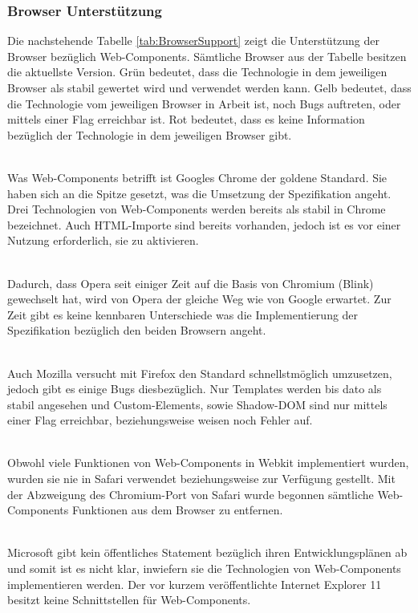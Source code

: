 \subsubsection{Browser Unterstützung}
\label{sec:3_WC_Support}

Die nachstehende Tabelle \ref{tab:BrowserSupport} zeigt die Unterstützung der Browser bezüglich Web-Components. Sämtliche Browser aus der Tabelle besitzen die aktuellste Version. Grün bedeutet, dass die Technologie in dem jeweiligen Browser als stabil gewertet wird und verwendet werden kann. Gelb bedeutet, dass die Technologie vom jeweiligen Browser in Arbeit ist, noch Bugs auftreten, oder mittels einer Flag erreichbar ist. Rot bedeutet, dass es keine Information bezüglich der Technologie in dem jeweiligen Browser gibt.

\begin{description}
 \hfill \\
Was Web-Components betrifft ist Googles Chrome der goldene Standard. Sie haben sich an die Spitze gesetzt, was die Umsetzung der Spezifikation angeht. Drei Technologien von Web-Components werden bereits als stabil in Chrome bezeichnet. Auch HTML-Importe sind bereits vorhanden, jedoch ist es vor einer Nutzung erforderlich, sie zu aktivieren.

 \hfill \\
Dadurch, dass Opera seit einiger Zeit auf die Basis von Chromium (Blink) gewechselt hat, wird von Opera der gleiche Weg wie von Google erwartet. Zur Zeit gibt es keine kennbaren Unterschiede was die Implementierung der Spezifikation bezüglich den beiden Browsern angeht.

 \hfill \\
Auch Mozilla versucht mit Firefox den Standard schnellstmöglich umzusetzen, jedoch gibt es einige Bugs diesbezüglich. Nur Templates werden bis dato als stabil angesehen und Custom-Elements, sowie Shadow-DOM sind nur mittels einer Flag erreichbar, beziehungsweise weisen noch Fehler auf.

 \hfill \\
Obwohl viele Funktionen von Web-Components in Webkit implementiert wurden, wurden sie nie in Safari verwendet beziehungsweise zur Verfügung gestellt. Mit der Abzweigung des Chromium-Port von Safari wurde begonnen sämtliche Web-Components Funktionen aus dem Browser zu entfernen.

 \hfill \\
Microsoft gibt kein öffentliches Statement bezüglich ihren Entwicklungsplänen ab und somit ist es nicht klar, inwiefern sie die Technologien von Web-Components implementieren werden. Der vor kurzem veröffentlichte Internet Explorer 11 besitzt keine Schnittstellen für Web-Components.

\end{description}

